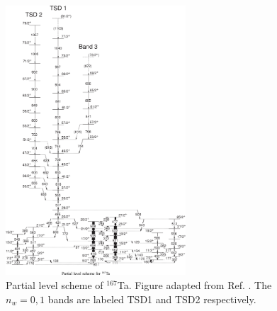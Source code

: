 \begin{figure}[ht!]
\centerline{\includegraphics[width=0.6\textwidth]{./img/c1/167Ta_scheme.png}}
	\caption{Partial level scheme of $^{167}$Ta. Figure adapted from Ref. \cite{wobblingIn167Ta}. The $n_w=0,1$ bands are labeled TSD1 and TSD2 respectively.\label{fig:chp1-last-wobb}}
\end{figure}

